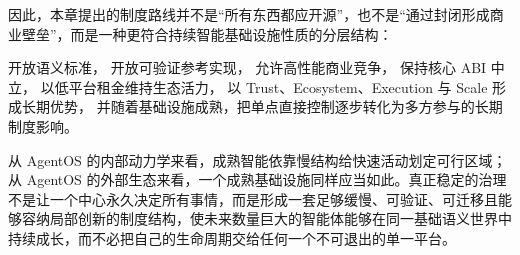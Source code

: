 因此，本章提出的制度路线并不是``所有东西都应开源''，也不是``通过封闭形成商业壁垒''，而是一种更符合持续智能基础设施性质的分层结构：
\begin{statementbox}
开放语义标准，
开放可验证参考实现，
允许高性能商业竞争，
保持核心 ABI 中立，
以低平台租金维持生态活力，
以 Trust、Ecosystem、Execution 与 Scale 形成长期优势，
并随着基础设施成熟，把单点直接控制逐步转化为多方参与的长期制度影响。
\end{statementbox}
从 AgentOS 的内部动力学来看，成熟智能依靠慢结构给快速活动划定可行区域；从 AgentOS 的外部生态来看，一个成熟基础设施同样应当如此。真正稳定的治理不是让一个中心永久决定所有事情，而是形成一套足够缓慢、可验证、可迁移且能够容纳局部创新的制度结构，使未来数量巨大的智能体能够在同一基础语义世界中持续成长，而不必把自己的生命周期交给任何一个不可退出的单一平台。
